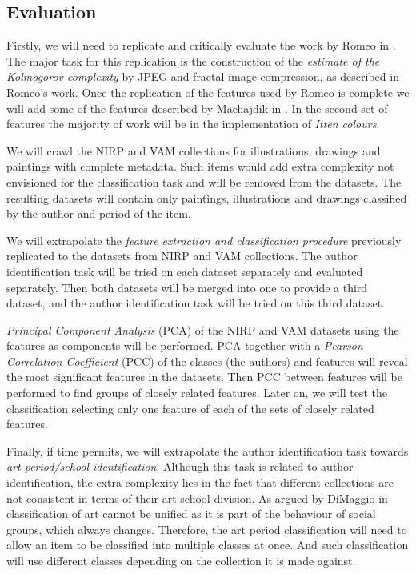 \documentclass[a4paper,twocolumn]{article}
\begin{document}
\subsection{Evaluation}

Firstly, we will need to replicate and critically evaluate the work by Romeo in
\cite{rmc12ajs}.  The major task for this replication is the construction of
the \emph{estimate of the Kolmogorov complexity} by JPEG and fractal image
compression, as described in Romeo's work. Once the replication of the features
used by Romeo is complete we will add some of the features described by
Machajdik in \cite{mach10clas}.  In the second set of features the majority of
work will be in the implementation of \emph{Itten colours}.

We will crawl the NIRP and VAM collections for illustrations, drawings and
paintings with complete metadata.  Such items would add extra complexity not
envisioned for the classification task and will be removed from the datasets.
The resulting datasets will contain only paintings, illustrations and drawings
classified by the author and period of the item.

We will extrapolate the \emph{feature extraction and classification procedure}
previously replicated to the datasets from NIRP and VAM collections.  The
author identification task will be tried on each dataset separately and
evaluated separately.  Then both datasets will be merged into one to provide a
third dataset, and the author identification task will be tried on this third
dataset.

\emph{Principal Component Analysis} (PCA) of the NIRP and VAM datasets using
the features as components will be performed.  PCA together with a
\emph{Pearson Correlation Coefficient} (PCC) of the classes (the authors) and
features will reveal the most significant features in the datasets.  Then PCC
between features will be performed to find groups of closely related features.
Later on, we will test the classification selecting only one feature of each of
the sets of closely related features.

Finally, if time permits, we will extrapolate the author identification task
towards \emph{art period/school identification}.  Although this task is related
to author identification, the extra complexity lies in the fact that different
collections are not consistent in terms of their art school division.  As
argued by DiMaggio in \cite{dimaggio87art} classification of art cannot be
unified as it is part of the behaviour of social groups, which always changes.
Therefore, the art period classification will need to allow an item to be
classified into multiple classes at once.  And such classification will use
different classes depending on the collection it is made against.
\end{document}
